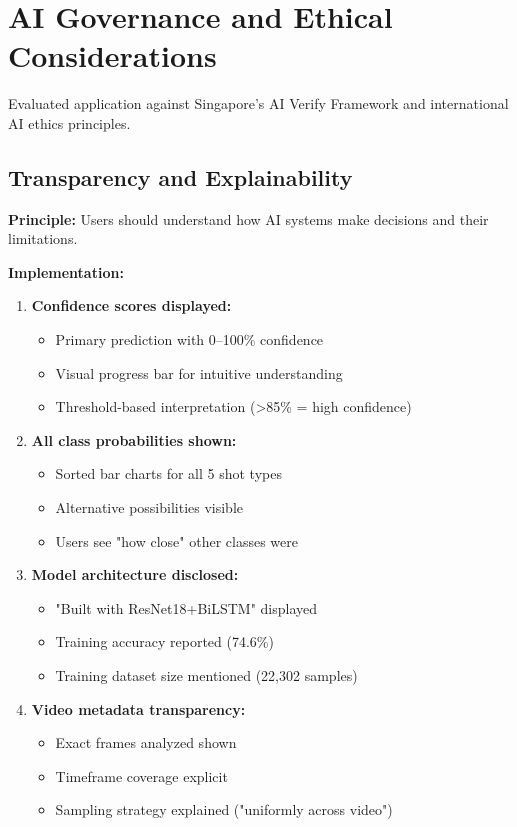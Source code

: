 \documentclass[11pt,a4paper]{article}
\begin{document}
\section{AI Governance and Ethical Considerations}

Evaluated application against Singapore's AI Verify Framework \cite{AIVerify} and international AI ethics principles.

\subsection{Transparency and Explainability}

\textbf{Principle:} Users should understand how AI systems make decisions and their limitations.

\textbf{Implementation:}

\begin{enumerate}
\item \textbf{Confidence scores displayed:}
   \begin{itemize}
   \item Primary prediction with 0--100\% confidence
   \item Visual progress bar for intuitive understanding
   \item Threshold-based interpretation (>85\% = high confidence)
   \end{itemize}

\item \textbf{All class probabilities shown:}
   \begin{itemize}
   \item Sorted bar charts for all 5 shot types
   \item Alternative possibilities visible
   \item Users see "how close" other classes were
   \end{itemize}

\item \textbf{Model architecture disclosed:}
   \begin{itemize}
   \item "Built with ResNet18+BiLSTM" displayed
   \item Training accuracy reported (74.6\%)
   \item Training dataset size mentioned (22,302 samples)
   \end{itemize}

\item \textbf{Video metadata transparency:}
   \begin{itemize}
   \item Exact frames analyzed shown
   \item Timeframe coverage explicit
   \item Sampling strategy explained ("uniformly across video")
   \end{itemize}


\end{enumerate}
\end{document}
